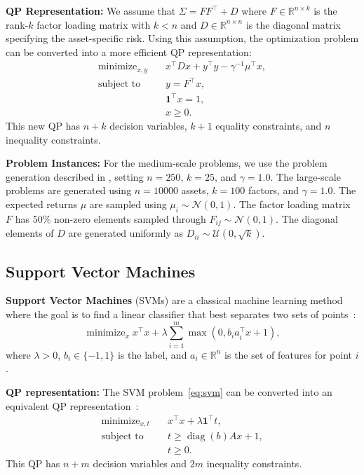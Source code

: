 \documentclass{article} %
\newcommand{\R}{\mathbb{R}}
\DeclareMathOperator*{\minimize}{minimize}
\DeclareMathOperator*{\st}{subject\ to}
\DeclareMathOperator{\diag}{diag}
\begin{document}
\textbf{QP Representation:} We assume that $\Sigma = F F^\top + D$ where $F \in \R^{n \times k}$ is the rank-$k$ factor loading matrix with $k < n$ and $D \in \R^{n \times n}$ is the diagonal matrix specifying the asset-specific risk. Using this assumption, the optimization problem can be converted into a more efficient QP representation:
\begin{subequations}
\begin{align}
    \minimize_{x, y} \quad & x^\top D x + y^\top y - \gamma^{-1} \mu^\top x, \\
    \st \quad & y = F^\top x, \\
                            & \mathbf{1}^\top x = 1, \\
                            & x \geq 0.
\end{align}
\end{subequations}
This new QP has $n + k$ decision variables, $k + 1$ equality constraints, and $n$ inequality constraints.

\textbf{Problem Instances:} For the medium-scale problems, we use the problem generation described in \citet{saravanos2025deep}, setting $n = 250$, $k = 25$, and $\gamma = 1.0$.
The large-scale problems are generated using $n = 10000$ assets, $k = 100$ factors, and $\gamma = 1.0$.
The expected returns $\mu$ are sampled using $\mu_i \sim \mathcal{N}(0, 1)$.
The factor loading matrix $F$ has 50\% non-zero elements sampled through $F_{ij} \sim \mathcal{N}(0, 1)$.
The diagonal elements of $D$ are generated uniformly as $D_{ii} \sim \mathcal{U}(0, \sqrt{k})$.


\subsection{Support Vector Machines}
\label{appendix:problem_classes:svm}

\textbf{Support Vector Machines} (SVMs) are a classical machine learning method where the goal is to find a linear classifier that best separates two sets of points~\citep{cortes1995support}:
\begin{equation} \label{eq:svm}
    \minimize_x x^\top x + \lambda \sum_{i = 1}^m \max(0, b_i a_i^\top x + 1),
\end{equation}
where $\lambda > 0$, $b_i \in \{-1, 1\}$ is the label, and $a_i \in \R^n$ is the set of features for point $i$.

\textbf{QP representation:} The SVM problem~\cref{eq:svm} can be converted into an equivalent QP representation~\citep{stellato2020osqp}:
\begin{subequations}
\begin{align}
    \minimize_{x, t} \quad       & x^\top x + \lambda \mathbf{1}^\top t, \\
    \st \quad & t \geq \diag(b) A x + 1, \\
                            & t \geq 0.
\end{align}
\end{subequations}
This QP has $n + m$ decision variables and $2m$ inequality constraints.
\end{document}
